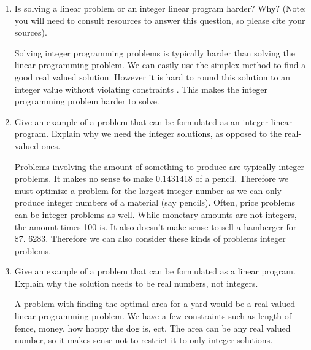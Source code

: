 \documentclass{article}
\begin{document}
\begin{enumerate}
\item Is solving a linear problem or an integer linear program harder?  Why?
(Note: you will need to consult resources to answer this question, so
please cite your sources).

Solving integer programming problems is typically harder than solving the linear programming problem.
We can easily use the simplex method to find a good real valued solution. However it is hard to round this solution to an integer value without violating constraints \cite{ip}.
This makes the integer programming problem harder to solve.

\item Give an example of a problem that can be formulated as an integer
linear program.  Explain why we need the integer solutions, as opposed
to the real-valued ones.

Problems involving the amount of something to produce are typically integer problems.
It makes no sense to make 0.1431418 of a pencil. Therefore we must optimize a problem for the largest integer number as we can only produce integer numbers of a material (say pencils).
Often, price problems can be integer problems as well. While monetary amounts are not integers,
the amount times 100 is. It also doesn't make sense to sell a hamberger for \$7.
6283. Therefore we can also consider these kinds of problems integer problems.


\item Give an example of a problem that can be formulated as a linear
program.  Explain why the solution needs to be real numbers, not integers.

A problem with finding the optimal area for a yard would be a real valued linear programming problem.
We have a few constraints such as length of fence, money, how happy the dog is, ect.
The area can be any real valued number, so it makes sense not to restrict it to only integer solutions.

\end{enumerate}

\cite{*}


\end{document}
